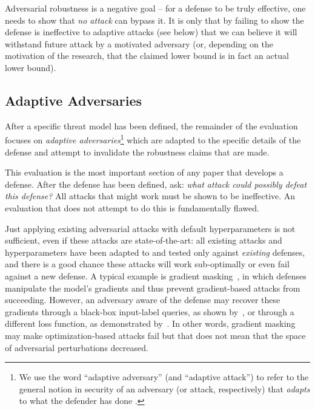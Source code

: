 \documentclass{article} %
\begin{document}
Adversarial robustness is a negative goal -- for a
defense to be truly effective, one needs to show that \emph{no attack} can bypass it.
%
It is only that by failing to show the defense is ineffective to
adaptive attacks (see below) that we can
believe it will withstand future attack by a motivated adversary (or,
depending on the motivation of the research, that the claimed lower bound is
in fact an actual lower bound).



\subsection{Adaptive Adversaries}
\label{sec:adaptive}

After a specific threat model has been defined, the remainder of the evaluation
focuses on \emph{adaptive adversaries}\footnote{We use the word ``adaptive
  adversary'' (and ``adaptive attack'') to refer to the general notion in
  security of an adversary (or attack, respectively)
  that \emph{adapts} to what the defender has done \citep{herley2017sok,carlini2017adversarial}.}
which are adapted to the specific details of the defense and attempt to invalidate
the robustness claims that are made.

This evaluation is the most important section of any paper that develops a
defense.
%
After the defense has been defined, ask: \emph{what attack could possibly defeat this
  defense?} All attacks that might work must be shown to be ineffective.
%
An evaluation that
does not attempt to do this is fundamentally flawed.

Just applying existing adversarial attacks with default hyperparameters
is not sufficient, even if these attacks
are state-of-the-art: all existing attacks and hyperparameters
have been adapted to and tested only against 
\emph{existing} defenses, and there is a good chance these attacks
will work sub-optimally or even fail against a new defense.
%
A typical example is gradient masking~\citep{tramer2017ensemble},
in which defenses manipulate the model's gradients and thus prevent
gradient-based attacks from succeeding.
%
However, an adversary aware of
the defense may recover these gradients through a black-box input-label queries, as
shown by~\citet{papernot2017practical}, or through a different loss
function, as demonstrated by~\cite{athalye2018obfuscated}.
%
In other words, gradient masking may make optimization-based attacks
fail but that does not mean that the space of adversarial perturbations decreased.
\end{document}
